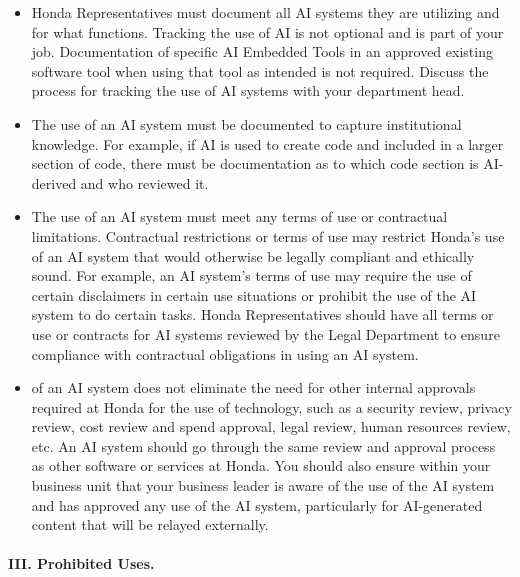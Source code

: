 \begin {itemize}
\item Honda Representatives must document all AI systems they are utilizing and for what functions. Tracking the use of AI is not optional and is part of your job. Documentation of specific AI Embedded Tools in an approved existing software tool when using that tool as intended is not required. Discuss the process for tracking the use of AI systems with your department head.
\item The use of an AI system must be documented to capture institutional knowledge. For example, if AI is used to create code and included in a larger section of code, there must be documentation as to which code section is AI-derived and who reviewed it.
\item The use of an AI system must meet any terms of use or contractual limitations. Contractual restrictions or terms of use may restrict Honda’s use of an AI system that would otherwise be legally compliant and ethically sound. For example, an AI system’s terms of use may require the use of certain disclaimers in certain use situations or prohibit the use of the AI system to do certain tasks. Honda Representatives should have all terms or use or contracts for AI systems reviewed by the Legal Department to ensure compliance with contractual obligations in using an AI system.
\item of an AI system does not eliminate the need for other internal approvals required at Honda for the use of technology, such as a security review, privacy review, cost review and spend approval, legal review, human resources review, etc. An AI system should go through the same review and approval process as other software or services at Honda. You should also ensure within your business unit that your business leader is aware of the use of the AI system and has approved any use of the AI system, particularly for AI-generated content that will be relayed externally.
\end {itemize}
\paragraph{\textbf III. Prohibited Uses.}
